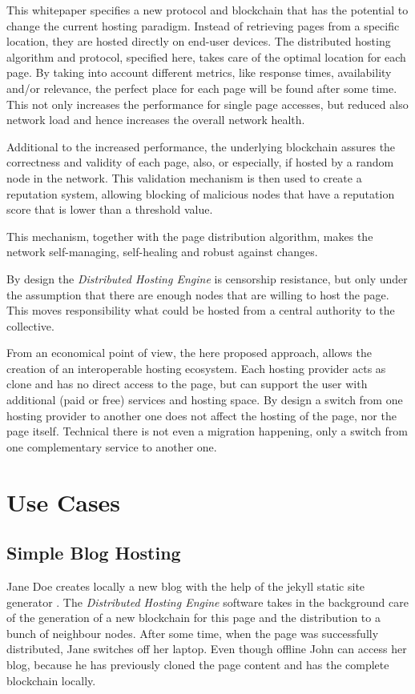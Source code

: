 This whitepaper specifies a new protocol and blockchain that has
the potential to change the current hosting paradigm. Instead of retrieving
pages from a specific location, they are hosted directly on end-user
devices. The distributed hosting algorithm and protocol, specified here, takes
care of the optimal location for each page. By taking into account different
metrics, like response times, availability and/or relevance, the perfect place
for each page will be found after some time. This not only increases the
performance for single page accesses, but reduced also network load and hence
increases the overall network health.

Additional to the increased performance, the underlying blockchain assures the
correctness and validity of each page, also, or especially, if hosted by a
random node in the network. This validation mechanism is then used to create a
reputation system, allowing blocking of malicious nodes that have a reputation
score that is lower than a threshold value.

This mechanism, together with the page distribution algorithm, makes the
network self-managing, self-healing and robust against changes.

By design the \textit{Distributed Hosting Engine} is censorship resistance,
but only under the assumption that there are enough nodes that are willing to
host the page. This moves responsibility what could be hosted from a central
authority to the collective.

From an economical point of view, the here proposed approach, allows the
creation of an interoperable hosting ecosystem. Each hosting provider acts as
clone and has no direct access to the page, but can support the user with
additional (paid or free) services and hosting space. By design a switch from
one hosting provider to another one does not affect the hosting of the page,
nor the page itself. Technical there is not even a migration happening, only a
switch from one complementary service to another one.

\section{Use Cases}

\subsection{Simple Blog Hosting}

Jane Doe creates locally a new blog with the help of the jekyll static site
generator \cite{Preston-Werner2015}. The \textit{Distributed Hosting Engine}
software takes in the background care of the generation of a new blockchain
for this page and the distribution to a bunch of neighbour nodes. After some
time, when the page was successfully distributed, Jane switches off her
laptop. Even though offline John can access her blog, because he has
previously cloned the page content and has the complete blockchain locally.

